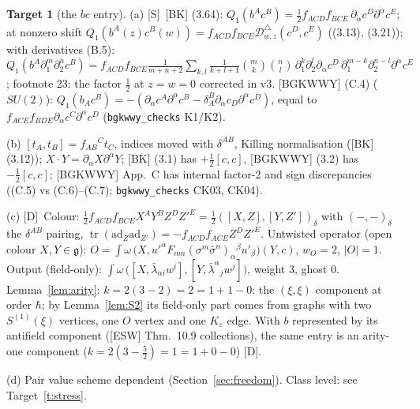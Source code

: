 \documentclass[11pt]{article}
\theoremstyle{definition}
\newtheorem{target}{Target}
\newcommand{\tr}{\operatorname{tr}}
\newcommand{\Sl}{\textup{[S]}}
\newcommand{\Dl}{\textup{[D]}}
\begin{document}
\begin{target}[the $bc$ entry]\label{t:bc}
(a) \Sl\ [BK] (3.64): $Q_1(b^Ac^B)=\tfrac12f_{ACD}f_{BCE}\,\partial_{\dot\alpha}c^D\partial^{\dot\alpha}c^E$; at nonzero shift $Q_1(b^A(z)c^B(w))=f_{ACD}f_{BCE}\mathcal D^\triangle_{w,z}(c^D,c^E)$ ((3.13), (3.21)); with derivatives (B.5): $Q_1(b^A\partial_1^m\partial_2^nc^B)=f_{ACD}f_{BCE}\frac1{m+n+2}\sum_{k,l}\frac1{k+l+1}\binom mk\binom nl\,\partial_1^k\partial_2^l\partial_{\dot\alpha}c^D\,\partial_1^{m-k}\partial_2^{n-l}\partial^{\dot\alpha}c^E$; footnote 23: the factor $\tfrac12$ at $z=w=0$ corrected in v3. [BGKWWY] (C.4) ($SU(2)$): $Q_1(b_Ac^B)=-(\partial_\alpha c^A\partial^\alpha c^B-\delta^B_A\partial_\alpha c_D\partial^\alpha c^D)$, equal to $f_{ACE}f_{BDE}\partial_\alpha c^C\partial^\alpha c^D$ (\texttt{bgkwwy\_checks} K1/K2).

(b) $[t_A,t_B]=f_{AB}{}^Ct_C$, indices moved with $\delta^{AB}$, Killing normalisation ([BK] (3.12)); $X\cdot Y=\partial_{\dot\alpha}X\partial^{\dot\alpha}Y$; [BK] (3.1) has $+\frac12[c,c]$, [BGKWWY] (3.2) has $-\frac12[c,c]$; [BGKWWY] App.~C has internal factor-2 and sign discrepancies ((C.5) vs (C.6)--(C.7); \texttt{bgkwwy\_checks} CK03, CK04).

(c) \Dl\ Colour: $\tfrac12f_{ACD}f_{BCE}X^AY^BZ^DZ'^E=\tfrac12([X,Z],[Y,Z'])_\delta$ with $(-,-)_\delta$ the $\delta^{AB}$ pairing, $\tr(\mathrm{ad}_Z\mathrm{ad}_{Z'})=-f_{ACD}f_{ACE}Z^DZ'^E$. Untwisted operator (open colour $X,Y\in\mathfrak g$): $O=\int\omega\,\big(X,u'^\alpha F_{mn}(\sigma^m\bar\sigma^n)_\alpha{}^\beta u'_\beta\big)(Y,c)$, $w_O=2$, $|O|=1$. Output (field-only): $\int\omega\,\big([X,\bar\lambda_{\dot\alpha i}w^i],[Y,\bar\lambda^{\dot\alpha}{}_jw^j]\big)$, weight $3$, ghost $0$. Lemma~\ref{lem:arity}: $k=2(3-2)=2=1+1-0$: the $(\xi,\xi)$ component at order $\hbar$; by Lemma~\ref{lem:S2} its field-only part comes from graphs with two $S^{(1)}(\xi)$ vertices, one $O$ vertex and one $K_\varepsilon$ edge. With $b$ represented by its antifield component ([ESW] Thm.~10.9 collections), the same entry is an arity-one component ($k=2(3-\tfrac52)=1=1+0-0$) \Dl.

(d) Pair value scheme dependent (Section~\ref{sec:freedom}). Class level: see Target~\ref{t:stress}.
\end{target}
\end{document}
